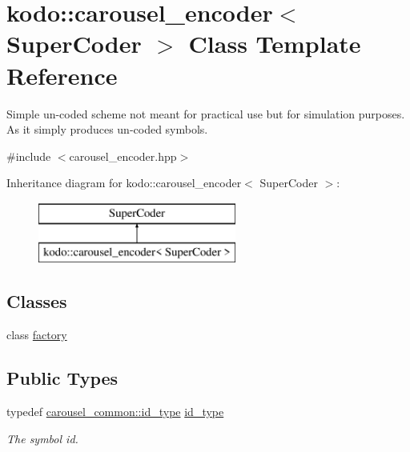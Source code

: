 \hypertarget{classkodo_1_1carousel__encoder}{\section{kodo\-:\-:carousel\-\_\-encoder$<$ Super\-Coder $>$ Class Template Reference}
\label{classkodo_1_1carousel__encoder}
}


Simple un-\/coded scheme not meant for practical use but for simulation purposes. As it simply produces un-\/coded symbols.  




{\ttfamily \#include $<$carousel\-\_\-encoder.\-hpp$>$}

Inheritance diagram for kodo\-:\-:carousel\-\_\-encoder$<$ Super\-Coder $>$\-:\begin{figure}[H]
\begin{center}
\leavevmode
\includegraphics[height=2.000000cm]{classkodo_1_1carousel__encoder}
\end{center}
\end{figure}
\subsection*{Classes}
\begin{DoxyCompactItemize}
\item 
class \hyperlink{classkodo_1_1carousel__encoder_1_1factory}{factory}
\end{DoxyCompactItemize}
\subsection*{Public Types}
\begin{DoxyCompactItemize}
\item 
\hypertarget{classkodo_1_1carousel__encoder_adf5f2259b7931438e86388bb93b83251}{typedef \hyperlink{classkodo_1_1carousel__common_aff8e05bd881924ffbfb317d778ff2de6}{carousel\-\_\-common\-::id\-\_\-type} \hyperlink{classkodo_1_1carousel__encoder_adf5f2259b7931438e86388bb93b83251}{id\-\_\-type}}\label{classkodo_1_1carousel__encoder_adf5f2259b7931438e86388bb93b83251}

\begin{DoxyCompactList}\small\item\em The symbol id. \end{DoxyCompactList}\end{DoxyCompactItemize}
